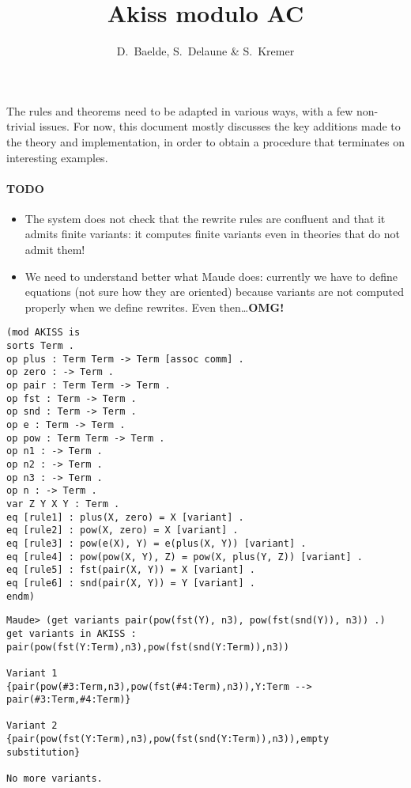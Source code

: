 \documentclass{article}
\title{Akiss modulo AC}
\author{D.~Baelde, S.~Delaune \& S.~Kremer}
\begin{document}
\maketitle

The rules and theorems need to be adapted in various ways,
with a few non-trivial issues. For now, this document mostly
discusses the key additions made to the theory and implementation,
in order to obtain a procedure that terminates
on interesting examples.

\paragraph{TODO}
\begin{itemize}
  \item The system does not check that the rewrite rules are confluent
    and that it admits finite variants: it computes finite variants
    even in theories that do not admit them!
  \item We need to understand better what Maude does:
    currently we have to define equations (not sure how they are
    oriented) because variants are not computed properly when
    we define rewrites.
    Even then\ldots \textbf{\large OMG!}
\end{itemize}
{\tiny
\begin{verbatim}
(mod AKISS is
sorts Term .
op plus : Term Term -> Term [assoc comm] .
op zero : -> Term .
op pair : Term Term -> Term .
op fst : Term -> Term .
op snd : Term -> Term .
op e : Term -> Term .
op pow : Term Term -> Term .
op n1 : -> Term .
op n2 : -> Term .
op n3 : -> Term .
op n : -> Term .
var Z Y X Y : Term .
eq [rule1] : plus(X, zero) = X [variant] .
eq [rule2] : pow(X, zero) = X [variant] .
eq [rule3] : pow(e(X), Y) = e(plus(X, Y)) [variant] .
eq [rule4] : pow(pow(X, Y), Z) = pow(X, plus(Y, Z)) [variant] .
eq [rule5] : fst(pair(X, Y)) = X [variant] .
eq [rule6] : snd(pair(X, Y)) = Y [variant] .
endm)
\end{verbatim}
}
\begin{verbatim}
Maude> (get variants pair(pow(fst(Y), n3), pow(fst(snd(Y)), n3)) .)
get variants in AKISS : pair(pow(fst(Y:Term),n3),pow(fst(snd(Y:Term)),n3))

Variant 1
{pair(pow(#3:Term,n3),pow(fst(#4:Term),n3)),Y:Term --> pair(#3:Term,#4:Term)}

Variant 2
{pair(pow(fst(Y:Term),n3),pow(fst(snd(Y:Term)),n3)),empty substitution}

No more variants.
\end{verbatim}
\end{document}
